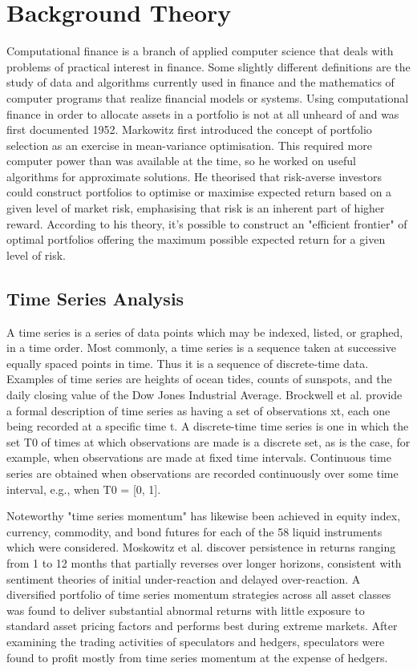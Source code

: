 \chapter{Background Theory}

Computational finance is a branch of applied computer science that deals with problems of practical interest in finance. Some slightly different definitions are the study of data and algorithms currently used in finance and the mathematics of computer programs that realize financial models or systems. Using computational finance in order to allocate assets in a portfolio is not at all unheard of and was first documented  1952.\cite{Markowitz:1952aa} Markowitz first introduced the concept of portfolio selection as an exercise in mean-variance optimisation. This required more computer power than was available at the time, so he worked on useful algorithms for approximate solutions. He theorised that risk-averse investors could construct portfolios to optimise or maximise expected return based on a given level of market risk, emphasising that risk is an inherent part of higher reward. According to his theory, it's possible to construct an "efficient frontier" of optimal portfolios offering the maximum possible expected return for a given level of risk. 

\section{Time Series Analysis}

A time series is a series of data points which may be indexed, listed, or graphed, in a time order. Most commonly, a time series is a sequence taken at successive equally spaced points in time. Thus it is a sequence of discrete-time data. Examples of time series are heights of ocean tides, counts of sunspots, and the daily closing value of the Dow Jones Industrial Average. Brockwell et al. provide a formal description of time series as having a set of observations xt, each one being recorded at a specific time t. A discrete-time time series is one in which the set T0 of times at which observations are made is a discrete set, as is the case, for example, when observations are made at fixed time intervals. Continuous time series are obtained when observations are recorded continuously over some time interval, e.g., when T0 = [0, 1].\cite{Peter-J.-Brockwell:2016aa}

Noteworthy "time series momentum" has likewise been achieved in equity index, currency, commodity, and bond futures for each of the 58 liquid instruments which were considered.\cite{Moskowitz:2011aa} Moskowitz et al. discover persistence in returns ranging from 1 to 12 months that partially reverses over longer horizons, consistent with sentiment theories of initial under-reaction and delayed over-reaction. A diversified portfolio of time series momentum strategies across all asset classes was found to deliver substantial abnormal returns with little exposure to standard asset pricing factors and performs best during extreme markets. After examining the trading activities of speculators and hedgers, speculators were found to profit mostly from time series momentum at the expense of hedgers.

